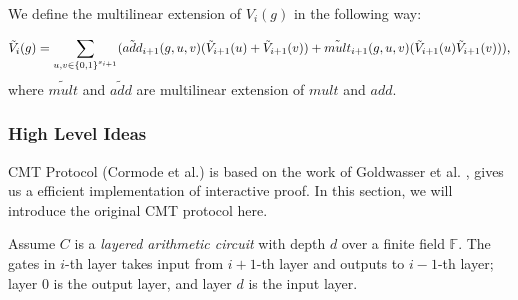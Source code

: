 \begin{definition}
	\label{def::multilinear}





	We define the multilinear extension of $V_i(g)$ in the following way:

	$$\tilde{V}_i(g)=\sum_{u, v \in \{0,1\}^{s_{i+1}}}(\tilde{add}_{i+1}(g, u, v)(\tilde{V}_{i+1}(u)+\tilde{V}_{i+1}(v))+\tilde{mult}_{i+1}(g,u,v)(\tilde{V}_{i+1}(u)\tilde{V}_{i+1}(v)))\textnormal{,}$$
	where $\tilde{mult}$ and $\tilde{add}$ are multilinear extension of $mult$ and $add$.
\end{definition}

\subsubsection{High Level Ideas}
CMT Protocol (Cormode et al.)\cite{CMT} is based on the work of Goldwasser et al. \cite{GKR}, gives us a efficient implementation of interactive proof. In this section, we will introduce the original CMT protocol here.

Assume $C$ is a \textit{layered arithmetic circuit} with depth $d$ over a finite field $\mathbb{F}$. The gates in $i$-th layer takes input from $i+1$-th layer and outputs to $i-1$-th layer; layer $0$ is the output layer, and layer $d$ is the input layer. 


